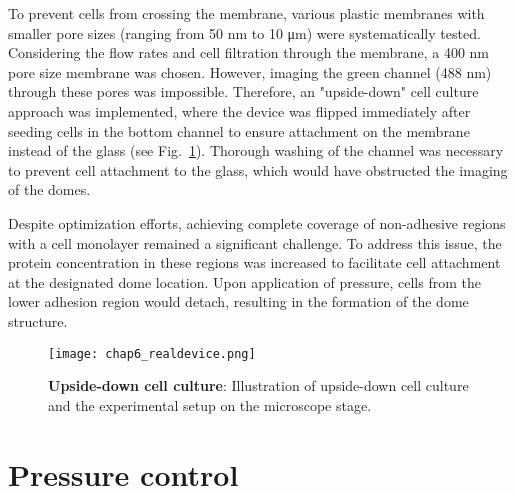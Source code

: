 To prevent cells from crossing the membrane, various plastic membranes with smaller pore sizes (ranging from 50 \unit{\nm} to 10 \unit{\um}) were systematically tested. Considering the flow rates and cell filtration through the membrane, a 400 \unit{\nm} pore size membrane was chosen. However, imaging the green channel (488 \unit{\nm}) through these pores was impossible. Therefore, an "upside-down" cell culture approach was implemented, where the device was flipped immediately after seeding cells in the bottom channel to ensure attachment on the membrane instead of the glass (see Fig.~\ref{fig_6_5}). Thorough washing of the channel was necessary to prevent cell attachment to the glass, which would have obstructed the imaging of the domes.

Despite optimization efforts, achieving complete coverage of non-adhesive regions with a cell monolayer remained a significant challenge. To address this issue, the protein concentration in these regions was increased to facilitate cell attachment at the designated dome location. Upon application of pressure, cells from the lower adhesion region would detach, resulting in the formation of the dome structure.


\begin{figure}[]
	\centering
	\texttt{[image: chap6\_realdevice.png]}
	\caption{\textbf{Upside-down cell culture}: Illustration of upside-down cell culture and the experimental setup on the microscope stage.}\label{fig_6_5}
\end{figure}

\hypertarget{pressure-control}{%
\section{Pressure control}\label{pressure-control}}

